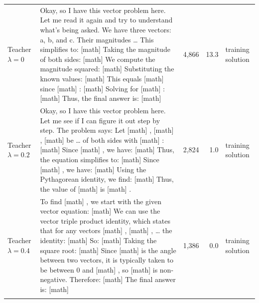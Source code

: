 \begin{tabular}{@{}p{}p{}rrp{}@{}}
\addlinespace
\midrule
Teacher $\lambda=0$ & Okay, so I have this vector problem here. Let me read it again and try to understand what's being asked. We have three vectors: a, b, and c. Their magnitudes \ldots{} This simplifies to: [math] Taking the magnitude of both sides: [math] We compute the magnitude squared: [math] Substituting the known values: [math] This equals [math] since [math] : [math] Solving for [math] : [math] Thus, the final answer is: [math] & 4,866 & 13.3 & training solution \\
\addlinespace
Teacher $\lambda=0.2$ & Okay, so I have this vector problem here. Let me see if I can figure it out step by step. The problem says: Let [math] , [math] , [math] be \ldots{} of both sides with [math] : [math] Since [math] , we have: [math] Thus, the equation simplifies to: [math] Since [math] , we have: [math] Using the Pythagorean identity, we find: [math] Thus, the value of [math] is [math] . & 2,824 & 1.0 & training solution \\
\addlinespace
Teacher $\lambda=0.4$ & To find [math] , we start with the given vector equation: [math] We can use the vector triple product identity, which states that for any vectors [math] , [math] , \ldots{} the identity: [math] So: [math] Taking the square root: [math] Since [math] is the angle between two vectors, it is typically taken to be between 0 and [math] , so [math] is non-negative. Therefore: [math] The final answer is: [math] & 1,386 & 0.0 & training solution \\
\addlinespace
\bottomrule
\end{tabular}
